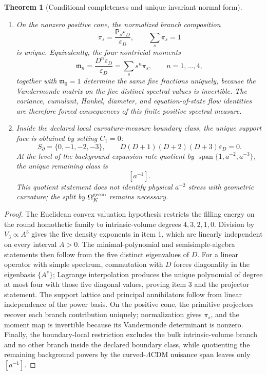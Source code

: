 \documentclass[11pt,a4paper]{article}
\def\Dil{D}%
\numberwithin{equation}{section}
\theoremstyle{definition}
\theoremstyle{plain}
\newtheorem{theorem}[criterion]{Theorem}
\theoremstyle{remark}
\newcommand{\Dil}{\mathscr{D}}
\newcommand{\epsD}{\varepsilon_D}
\begin{document}
\begin{theorem}[Conditional completeness and unique invariant normal form]
\begin{enumerate}
\item On the nonzero positive cone, the normalized branch composition
\begin{equation}
\boxed{\pi_s=\frac{\mathsf P_s\epsD}{\epsD},\qquad \sum_s\pi_s=1}
\end{equation}
is unique.  Equivalently, the four nontrivial moments
\begin{equation}
\mathfrak m_n=\frac{\Dil^n\epsD}{\epsD}=\sum_s s^n\pi_s,
\qquad n=1,\ldots,4,
\end{equation}
together with \(\mathfrak m_0=1\) determine the same five fractions uniquely,
because the Vandermonde matrix on the five distinct spectral values is
invertible.  The variance, cumulant, Hankel, diameter, and equation-of-state
flow identities are therefore forced consequences of this finite positive
spectral measure.

\item Inside the declared local curvature-measure boundary class, the unique
support face is obtained by setting \(C_1=0\):
\begin{equation}
\boxed{S_\partial=\{0,-1,-2,-3\},\qquad
\Dil(\Dil+1)(\Dil+2)(\Dil+3)\epsD=0.}
\end{equation}
At the level of the background expansion-rate quotient by
\(\operatorname{span}\{1,a^{-2},a^{-3}\}\), the unique remaining class is
\begin{equation}
\boxed{[a^{-1}].}
\end{equation}
This quotient statement does not identify physical \(a^{-2}\) stress with
geometric curvature; the split by \(\Omega_K^{\rm geom}\) remains necessary.
\end{enumerate}
\end{theorem}

\begin{proof}
The Euclidean convex valuation hypothesis restricts the filling energy on the
round homothetic family to intrinsic-volume degrees \(4,3,2,1,0\).  Division by
\(V_3\propto A^3\) gives the five density exponents in item 1, which are
linearly independent on every interval \(A>0\).  The minimal-polynomial and
semisimple-algebra statements then follow from the five distinct eigenvalues of
\(\Dil\).  For a linear operator with simple spectrum, commutation with
\(\Dil\) forces diagonality in the eigenbasis \(\{A^s\}\); Lagrange
interpolation produces the unique polynomial of degree at most four with those
five diagonal values, proving item 3 and the projector statement.  The support
lattice and principal annihilators follow from linear independence of the power
basis.  On the positive cone, the primitive projectors recover each branch
contribution uniquely; normalization gives \(\pi_s\), and the moment map is
invertible because its Vandermonde determinant is nonzero.  Finally, the
boundary-local restriction excludes the bulk intrinsic-volume branch and no
other branch inside the declared boundary class, while quotienting the
remaining background powers by the curved-\(\Lambda\)CDM nuisance span leaves
only \([a^{-1}]\).
\end{proof}
\end{document}
